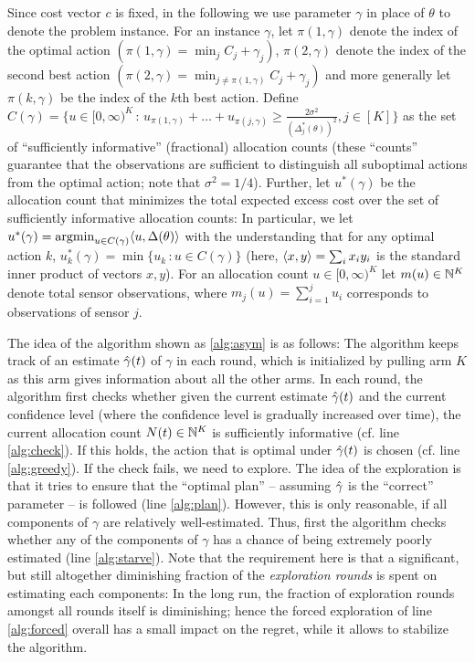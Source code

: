Since cost vector $c$ is fixed, in the following we use parameter $\gamma$ in place of $\theta$ to denote the problem instance.
For an instance $\gamma$, let $\pi(1,\gamma)$ denote the index of the optimal action $(\pi(1,\gamma) = \min_j C_j+\gamma_j)$,
$\pi(2,\gamma)$ denote the index of the second best action $(\pi(2,\gamma) = \min_{j\ne \pi(1,\gamma)} C_j +\gamma_j)$ and
more generally let $\pi(k,\gamma)$ be the index of the $k$th best action.
Define $C(\gamma) = \{ u\in [0,\infty)^K\,:\, u_{\pi(1,\gamma)} + \dots + u_{\pi(j,\gamma)} \ge \frac{2\sigma^2}{(\Delta_j^*(\theta))^2}, j\in [K] \}$
as the set of ``sufficiently informative'' (fractional)  allocation counts 
(these ``counts'' guarantee that the observations are sufficient to distinguish all suboptimal actions from the optimal action; note that $\sigma^2=1/4$).
Further, let $u^*(\gamma)$
be the allocation count that minimizes the total expected excess cost over the set of sufficiently informative allocation counts:
In particular,  we let $u^*(\gamma) = \operatorname{argmin}_{u\in C(\gamma)} \langle  u, \Delta(\theta)  \rangle$ 
with the understanding that for any optimal action $k$, $u_k^*(\gamma) = \min \{ u_k \,: u\in C(\gamma) \}$ (here, $\langle x,y \rangle = \sum_i x_i y_i$ is the standard inner product of vectors $x,y$).
For an allocation count $u\in [0,\infty)^K$ let $m(u)\in \mathbb{N}^K$ denote total sensor observations, where $m_j(u) = \sum_{i=1}^j u_i$ corresponds to observations of sensor $j$.

The idea of the algorithm shown as \cref{alg:asym} is as follows:
The algorithm keeps track of an estimate $\hat{\gamma}(t)$ of $\gamma$ in each round, which is initialized by pulling arm $K$ as this arm
gives information about all the other arms.
In each round, the algorithm first checks whether given the current estimate $\hat{\gamma}(t)$ and the current confidence level (where the confidence level is gradually increased over time), the current allocation count $N(t)\in \mathbb{N}^K$
is sufficiently informative (cf. line \ref{alg:check}). If this holds, the action that is optimal under $\hat{\gamma}(t)$ is chosen 
(cf. line \ref{alg:greedy}). If the check fails, we need to explore.
The idea of the exploration is that it tries to ensure that the ``optimal plan'' -- assuming $\hat{\gamma}$ is the ``correct'' parameter -- is followed (line \ref{alg:plan}). However, this is only reasonable, if all components of $\gamma$ are relatively well-estimated.
Thus, first the algorithm checks whether any of the components of $\gamma$ has a chance of being
extremely poorly estimated (line \ref{alg:starve}). Note that the requirement here is that a significant, but still altogether diminishing fraction of the \emph{exploration rounds} is spent on estimating each components: In the long run, the fraction of exploration rounds amongst all rounds itself is diminishing; hence the forced exploration of line \ref{alg:forced} overall has a small impact on the regret, while it allows to stabilize the algorithm.

